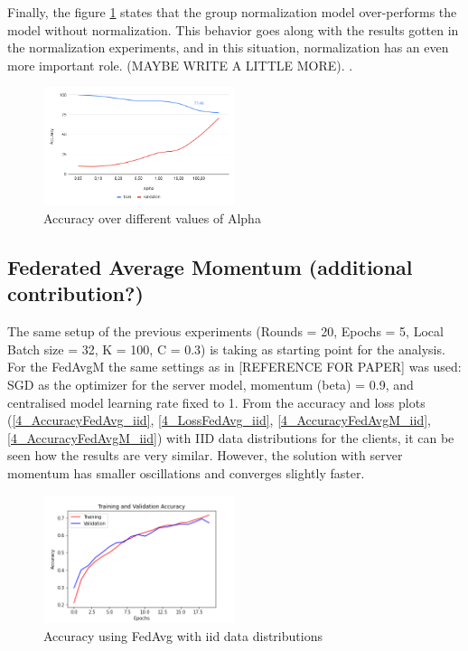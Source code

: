 \documentclass[twocolumn]{article}
\begin{document}
Finally, the figure \ref{AccAlpha} states that the group normalization model over-performs the model without normalization. This behavior goes along with the results gotten in the normalization experiments, and in this situation, normalization has an even more important role. (MAYBE WRITE A LITTLE MORE).
.


\begin{figure}
    \centering
    \includegraphics[width=0.5\textwidth,height=.3\textheight]{alphaAccuracy.png}
    \caption{Accuracy over different values of Alpha}
    \label{AccAlpha} 
\end{figure}


\subsection{Federated Average Momentum (additional contribution?)}

The same setup of the previous experiments (Rounds = 20, Epochs = 5, Local Batch size = 32, K = 100, C = 0.3) is taking as starting point for the analysis.
For the FedAvgM the same settings as in [REFERENCE FOR PAPER] was used: SGD as the optimizer for the server model,  momentum (beta) = 0.9, and centralised model learning rate fixed to 1.
From the accuracy and loss plots (\ref{4_AccuracyFedAvg_iid}, \ref{4_LossFedAvg_iid}, \ref{4_AccuracyFedAvgM_iid}, \ref{4_AccuracyFedAvgM_iid}) with IID data distributions for the clients, it can be seen how the results are very similar. However, the solution with server momentum has smaller oscillations and converges slightly faster. 

\begin{figure}
    \centering
    \includegraphics[width=0.5\textwidth,height=.3\textheight]{4_AccuracyFedAvg_iid.png}
    \caption{Accuracy using FedAvg with iid data distributions}
     \label{AccFedAvgIid} 
\end{figure}
\end{document}
